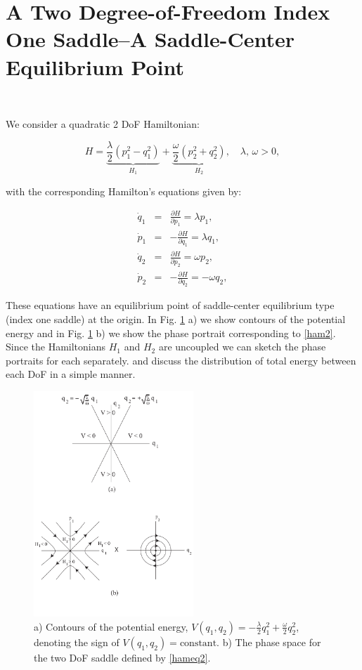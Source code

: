 \documentclass{article}
\begin{document}
\section*{A Two Degree-of-Freedom Index One Saddle--A  Saddle-Center Equilibrium Point}
\


We consider  a quadratic 2 DoF  Hamiltonian:


\begin{equation}
H = \underbrace{\frac{\lambda}{2} \left(p_1^2 - q_1^2 \right)}_{H_1} + \underbrace{\frac{\omega}{2} \left(p_2^2 + q_2^2 \right)}_{H_2}, \quad \lambda, \, \omega >0,
\label{ham2}
\end{equation}

\noindent
with the corresponding Hamilton's equations given by:

\begin{eqnarray}
\dot{q}_1 & = & \frac{\partial H}{\partial p_1}= \lambda p_1, \nonumber \\
\dot{p}_1 & = & -\frac{\partial H}{\partial q_1}= \lambda q_1, \nonumber \\
\dot{q}_2 & = & \frac{\partial H}{\partial p_2}= \omega p_2, \nonumber \\
\dot{p}_2 & = & -\frac{\partial H}{\partial q_2}= -\omega q_2, 
\label{hameq2}
\end{eqnarray}

\noindent
These equations have an equilibrium point of saddle-center equilibrium type (index one saddle) at the origin.
In Fig. \ref{fig:2 dof saddle} a) we show contours  of the potential energy and in Fig. \ref{fig:2 dof saddle} b) we show the phase portrait corresponding to \eqref{ham2}. 
Since the Hamiltonians $H_1$ and $H_2$ are uncoupled we can sketch the phase portraits for each separately.  and discuss the distribution of total energy between each DoF in a simple manner.



\begin{figure}[htb!]
\begin{center}
\includegraphics[width=6.0cm]{fig_2_dof_saddle.png}
\end{center}
\caption{a) Contours of the potential energy, $V(q_1, q_2) =-\frac{\lambda}{2} q_1^2 + \frac{\omega}{2} q_2^2$,  denoting the sign of $V(q_1, q_2) = \mbox{constant}$. b) The phase space for the two DoF saddle defined by \eqref{hameq2}.}
\label{fig:2 dof saddle}
\end{figure}
\end{document}
